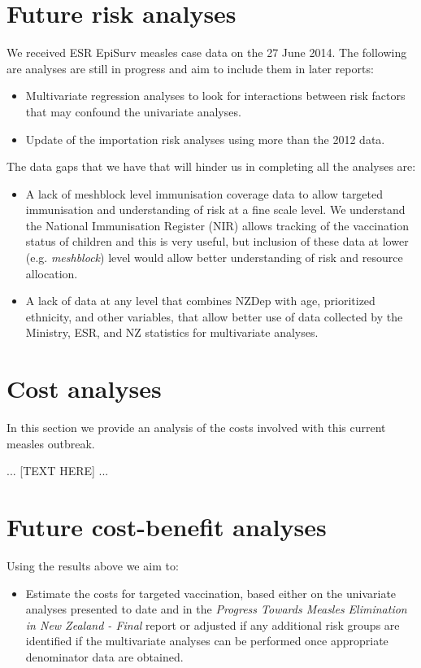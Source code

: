 \documentclass{article}
\begin{document}
\section{Future risk analyses}
We received ESR EpiSurv measles case data on the 27 June 2014. The following are analyses are still in progress and aim to include them in later reports:
\begin{itemize}
\item Multivariate regression analyses to look for interactions between risk factors that may confound the univariate analyses.
\item Update of the importation risk analyses using more than the 2012 data.
\end{itemize}
The data gaps that we have that will hinder us in completing all the analyses are:
\begin{itemize}
\item A lack of meshblock level immunisation coverage data to allow targeted immunisation and understanding of risk at a fine scale level. We understand the National Immunisation Register (NIR) allows tracking of the vaccination status of children and this is very useful, but inclusion of these data at lower (e.g. \emph{meshblock}) level would allow better understanding of risk and resource allocation.
\item A lack of data at any level that combines NZDep with age, prioritized ethnicity, and other variables, that allow better use of data collected by the Ministry, ESR, and NZ statistics for multivariate analyses.
\end{itemize}

\section{Cost analyses}

In this section we provide an analysis of the costs involved with this current measles outbreak.

... [TEXT HERE] ...

\section{Future cost-benefit analyses}
Using the results above we aim to:
\begin{itemize}
\item Estimate the costs for targeted vaccination, based either on the univariate analyses presented to date and in the \emph {Progress Towards Measles Elimination in New Zealand - Final} report or adjusted if any additional risk groups are identified if the multivariate analyses can be performed once appropriate denominator data are obtained.
\end{itemize}
\end{document}
